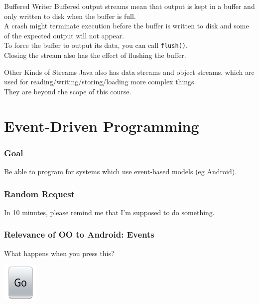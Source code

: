 \documentclass[aspectratio=169]{beamer}
\begin{document}
\begin{frame}{Buffered Writer}
Buffered output streams mean that output is kept in a buffer and only written to disk when the buffer is full. \\
A crash might terminate execution before the buffer is written to disk and some of the expected output will not appear. \\
To force the buffer to output its data, you can call \texttt{flush()}. \\
Closing the stream also has the effect of flushing the buffer.
\end{frame}



\begin{frame}{Other Kinds of Streams}
Java also has data streams and object streams, which are used for reading/writing/storing/loading more complex things. \\
They are beyond the scope of this course.
\end{frame}



\section*{Event-Driven Programming}


\begin{frame}
\frametitle{Goal}
\Large
Be able to program for systems which use event-based models (eg Android).
\end{frame}


\begin{frame}
\frametitle{Random Request}
In 10 minutes, please remind me that I'm supposed to do something.
\end{frame}

\begin{frame}
\frametitle{Relevance of OO to Android: Events}
What happens when you press this?
\begin{center}
\includegraphics{img/go-button}
\end{center}
\large {}
\end{frame}
\end{document}
